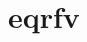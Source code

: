 \documentclass{beamer}
\begin{document}
    \part{eqrfv}

    \begin{frame}
        \partpage
    \end{frame}
\end{document}
